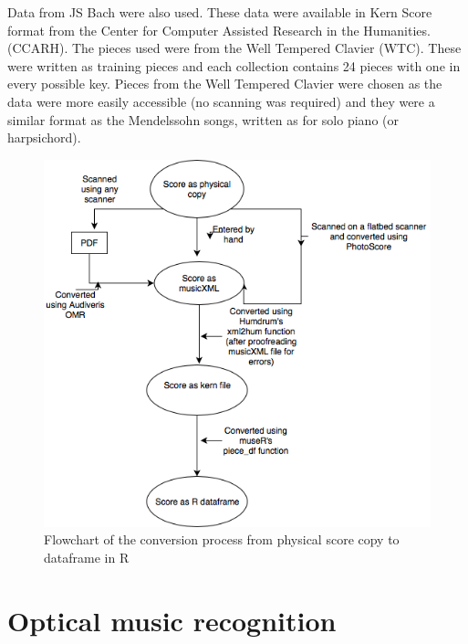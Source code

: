 \documentclass[12pt,twoside]{reedthesis}
\theoremstyle{definition}
\theoremstyle{definition}
\theoremstyle{definition}
\theoremstyle{remark}
\begin{document}
Data from JS Bach were also used. These data were available in Kern
Score format from the Center for Computer Assisted Research in the
Humanities. (CCARH). The pieces used were from the Well Tempered Clavier
(WTC). These were written as training pieces and each collection
contains 24 pieces with one in every possible key. Pieces from the Well
Tempered Clavier were chosen as the data were more easily accessible (no
scanning was required) and they were a similar format as the Mendelssohn
songs, written as for solo piano (or harpsichord).
\begin{figure}[h]
\centering
\includegraphics[scale = .5]{images/test.png}
\caption{Flowchart of the conversion process from physical score copy to dataframe in R}
\label{subd}
\end{figure}
\section{Optical music recognition}\label{optical-music-recognition}
\end{document}
